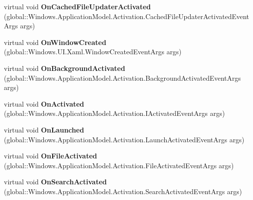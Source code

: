\begin{DoxyCompactItemize}
\item 
\mbox{\label{class_windows_1_1_u_i_1_1_xaml_1_1_application_a7f572e2107540b33cb772a84ddd7ec72}} 
virtual void {\bfseries On\+Cached\+File\+Updater\+Activated} (global\+::\+Windows.\+Application\+Model.\+Activation.\+Cached\+File\+Updater\+Activated\+Event\+Args args)
\item 
\mbox{\label{class_windows_1_1_u_i_1_1_xaml_1_1_application_a69d851136f5764f6fb1d953b4447219f}} 
virtual void {\bfseries On\+Window\+Created} (global\+::\+Windows.\+U\+I.\+Xaml.\+Window\+Created\+Event\+Args args)
\item 
\mbox{\label{class_windows_1_1_u_i_1_1_xaml_1_1_application_a99448e12dcdd4516781f0aba248db35e}} 
virtual void {\bfseries On\+Background\+Activated} (global\+::\+Windows.\+Application\+Model.\+Activation.\+Background\+Activated\+Event\+Args args)
\item 
\mbox{\label{class_windows_1_1_u_i_1_1_xaml_1_1_application_a1007269442b51bcb8b6f72fb5c538c4d}} 
virtual void {\bfseries On\+Activated} (global\+::\+Windows.\+Application\+Model.\+Activation.\+I\+Activated\+Event\+Args args)
\item 
\mbox{\label{class_windows_1_1_u_i_1_1_xaml_1_1_application_ac34abc539f620025d7e6026118ec1fb9}} 
virtual void {\bfseries On\+Launched} (global\+::\+Windows.\+Application\+Model.\+Activation.\+Launch\+Activated\+Event\+Args args)
\item 
\mbox{\label{class_windows_1_1_u_i_1_1_xaml_1_1_application_ad3a115248881604e559640ff7d3f1510}} 
virtual void {\bfseries On\+File\+Activated} (global\+::\+Windows.\+Application\+Model.\+Activation.\+File\+Activated\+Event\+Args args)
\item 
\mbox{\label{class_windows_1_1_u_i_1_1_xaml_1_1_application_a361d968000b09b19ff4e794b6550ff86}} 
virtual void {\bfseries On\+Search\+Activated} (global\+::\+Windows.\+Application\+Model.\+Activation.\+Search\+Activated\+Event\+Args args)

\end{DoxyCompactItemize}
